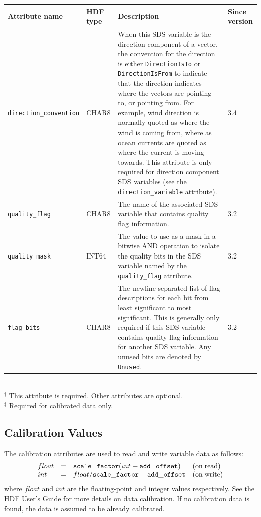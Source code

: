 \begin{tabular}{|l|l|p{7.5cm}|l|}

  \hline

  Attribute name & HDF type & Description & Since version \\ \hline

  {\tt direction\_convention} & CHAR8 & When this SDS variable is the
  direction component of a vector, the convention for the direction is
  either {\tt DirectionIsTo} or {\tt DirectionIsFrom} to indicate that
  the direction indicates where the vectors are pointing to, or
  pointing from. For example, wind direction is normally quoted as
  where the wind is coming from, where as ocean currents are quoted as
  where the current is moving towards. This attribute is only required
  for direction component SDS variables (see the {\tt
  direction\_variable} attribute). & 3.4 \\ \hline

  {\tt quality\_flag} & CHAR8 & The name of the associated SDS
  variable that contains quality flag information. & 3.2 \\ \hline

  {\tt quality\_mask} & INT64 & The value to use as a mask in a
  bitwise AND operation to isolate the quality bits in the SDS
  variable named by the {\tt quality\_flag} attribute. & 3.2 \\ \hline

  {\tt flag\_bits} & CHAR8 & The newline-separated list of flag
  descriptions for each bit from least significant to most
  significant. This is generally only required if this SDS variable
  contains quality flag information for another SDS variable. Any
  unused bits are denoted by {\tt Unused}. & 3.2 \\ \hline

\end{tabular} \\
$^{\dagger}$ This attribute is required. Other attributes are optional.\\ 
$^{\ddagger}$ Required for calibrated data only. 

\subsection{Calibration Values}

The calibration attributes are used to read and write variable data as
follows:
\[
\begin{array}{llll}
  float & = & {\tt scale\_factor} (int - {\tt add\_offset}) &{\rm (on\;read)}\\
  int & = & float / {\tt scale\_factor} + {\tt add\_offset} &{\rm (on\;write)}
\end{array}
\]
where $float$ and $int$ are the floating-point and integer values
respectively. See the HDF User's Guide for more details on data
calibration. If no calibration data is found, the data is assumed to
be already calibrated.

